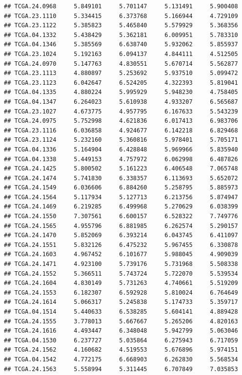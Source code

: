 \documentclass[UTF8]{beamer}\usepackage[]{graphicx}\usepackage[]{color}
\makeatletter
\newenvironment{kframe}{%
 \def\at@end@of@kframe{}%
 \ifinner\ifhmode%
  \def\at@end@of@kframe{\end{minipage}}%
  \begin{minipage}{\columnwidth}%
 \fi\fi%
 \def\FrameCommand##1{\hskip\@totalleftmargin \hskip-\fboxsep
 \colorbox{shadecolor}{##1}\hskip-\fboxsep
     \hskip-\linewidth \hskip-\@totalleftmargin \hskip\columnwidth}%
 \MakeFramed {\advance\hsize-\width
   \@totalleftmargin\z@ \linewidth\hsize
   \@setminipage}}%
 {\par\unskip\endMakeFramed%
 \at@end@of@kframe}
\newenvironment{knitrout}{}{} %
\makeatother
\begin{document}
\begin{frame}[fragile]
\begin{knitrout}
\begin{kframe}
\begin{verbatim}
## TCGA.24.0968     5.849101     5.701147     5.131491     5.900408
## TCGA.23.1110     5.334415     6.373768     5.166944     4.729109
## TCGA.23.1122     5.385823     5.465840     5.579929     5.368356
## TCGA.04.1332     5.438429     5.362181     6.009951     5.783310
## TCGA.04.1346     5.385569     6.638740     5.932062     5.855937
## TCGA.23.1024     5.192163     6.094137     4.844111     4.512505
## TCGA.24.0970     5.147763     4.830551     5.670714     5.562877
## TCGA.23.1113     4.880897     5.253692     5.937510     5.099472
## TCGA.23.1123     6.042647     6.524205     4.322393     5.819041
## TCGA.04.1335     4.880224     5.995929     5.948230     4.758405
## TCGA.04.1347     6.264023     5.610938     4.933207     6.565687
## TCGA.23.1027     4.673775     4.957795     6.167633     5.543239
## TCGA.24.0975     5.752998     4.621836     6.017413     6.983706
## TCGA.23.1116     6.036858     4.924677     6.142218     6.829468
## TCGA.23.1124     5.232160     5.360816     5.978401     5.705171
## TCGA.04.1336     5.164904     6.428848     5.969966     5.835940
## TCGA.04.1338     5.449153     4.757972     6.062998     6.487826
## TCGA.24.1425     5.800502     5.161223     6.406548     7.065748
## TCGA.24.1474     5.741830     6.338357     6.113693     5.652072
## TCGA.24.1549     6.036606     6.884260     5.258795     5.885973
## TCGA.24.1564     5.117934     5.127713     6.213756     5.874947
## TCGA.24.1469     6.219285     6.499968     5.270629     6.038399
## TCGA.24.1550     7.307561     6.600157     6.528322     7.749776
## TCGA.24.1565     4.955796     6.881985     6.262574     5.290157
## TCGA.24.1470     5.852069     6.393214     6.043745     6.411097
## TCGA.24.1551     5.832126     6.475232     5.967455     6.330878
## TCGA.24.1603     4.967452     6.101677     5.988045     4.909039
## TCGA.24.1471     4.923100     5.739176     5.731968     5.508338
## TCGA.24.1552     5.366511     5.743724     5.722070     5.539534
## TCGA.24.1604     4.830149     5.731263     4.740661     5.519209
## TCGA.24.1553     6.182307     6.592928     5.810024     6.764649
## TCGA.24.1614     5.066317     5.245838     5.174733     5.359717
## TCGA.04.1514     5.440633     6.538285     5.604141     4.889428
## TCGA.24.1555     3.778013     5.667667     5.265206     4.820163
## TCGA.24.1616     4.493447     6.348048     5.942799     5.063046
## TCGA.04.1530     6.237727     5.035864     6.275943     6.717059
## TCGA.24.1562     4.160682     4.519553     5.676896     5.974151
## TCGA.04.1542     4.772175     6.668903     6.262830     5.568534
## TCGA.24.1563     5.558994     5.311445     6.707849     7.035853

\end{verbatim}
\end{kframe}
\end{knitrout}
\end{frame}
\end{document}

